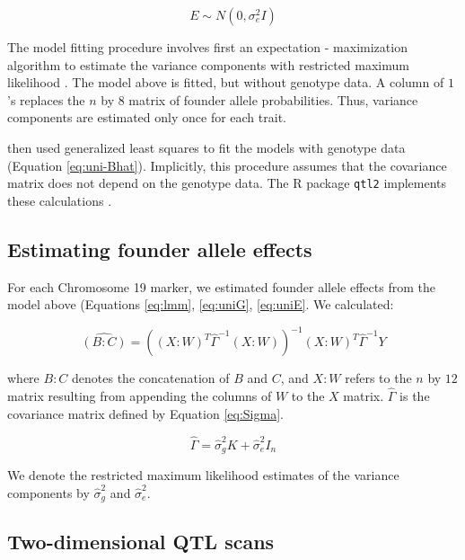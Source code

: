 \documentclass{article}
\begin{document}
\begin{equation}\label{eq:uniE}
E \sim N(0, \sigma_e^2I)
\end{equation}


The model fitting procedure involves first an expectation - maximization algorithm to estimate the variance components with restricted maximum likelihood \citep{broman2018}. The model above is fitted, but without genotype data. A column of $1$'s replaces the $n$ by $8$ matrix of founder allele probabilities. Thus, variance components are estimated only once for each trait.

\citet{keller2018genetic} then used generalized least squares to fit the models with genotype data (Equation \ref{eq:uni-Bhat}). Implicitly, this procedure assumes that the covariance matrix does not depend on the genotype data. The R package \texttt{qtl2} implements these calculations \citep{broman2018}. 

\subsection{Estimating founder allele effects}

For each Chromosome 19 marker, we estimated founder allele effects from the model above (Equations \ref{eq:lmm}, \ref{eq:uniG}, \ref{eq:uniE}. We calculated:

\begin{equation}\label{eq:uni-Bhat}
\widehat {(B:C)} = \left((X:W)^T\hat\Gamma^{-1}(X:W)\right)^{-1}(X:W)^T\hat\Gamma^{-1}Y
\end{equation}

\noindent where $B:C$ denotes the concatenation of $B$ and $C$, and $X:W$ refers to the $n$ by $12$ matrix resulting from appending the columns of $W$ to the $X$ matrix. $\hat\Gamma$ is the covariance matrix defined by Equation \ref{eq:Sigma}.

\begin{equation}\label{eq:Sigma}
\hat \Gamma = \hat\sigma_g^2 K + \hat \sigma_e^2 I_n
\end{equation}

\noindent We denote the restricted maximum likelihood estimates of the variance components by $\hat \sigma_g^2$ and $\hat \sigma_e^2$. 



\subsection{Two-dimensional QTL scans}
\end{document}
